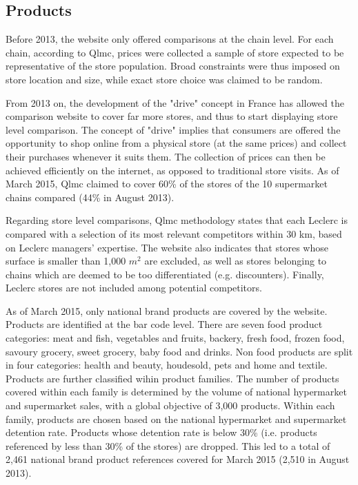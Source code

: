 \documentclass[english]{article}
\begin{document}
\subsection{Products}

Before 2013, the website only offered comparisons at the chain level. For each chain, according to Qlmc, prices were collected a sample of store expected to be representative of the store population. Broad constraints were thus imposed on store location and size, while exact store choice was claimed to be random.

From 2013 on, the development of the "drive" concept in France has allowed the comparison website to cover far more stores, and thus to start displaying store level comparison. The concept of "drive" implies that consumers are offered the opportunity to shop online from a physical store (at the same prices) and collect their purchases whenever it suits them. The collection of prices can then be achieved efficiently on the internet, as opposed to traditional store visits. As of March 2015, Qlmc claimed to cover 60\% of the stores of the 10 supermarket chains compared (44\% in August 2013).

Regarding store level comparisons, Qlmc  methodology states that each Leclerc is compared with a selection of its most relevant competitors within 30 km, based on Leclerc managers' expertise. The website also indicates that stores whose surface is smaller than 1,000 $m^2$ are excluded, as well as stores belonging to chains which are deemed to be too differentiated (e.g. discounters). Finally, Leclerc stores are not included among potential competitors.

As of March 2015, only national brand products are covered by the website. Products are identified at the bar code level. There are seven food product categories: meat and fish, vegetables and fruits, backery, fresh food, frozen food, savoury grocery, sweet grocery, baby food and drinks. Non food products are split in four categories: health and beauty, houdesold, pets and home and textile. Products are further classified wihin product families. The number of products covered within each family is determined by the volume of national hypermarket and supermarket sales, with a global objective of 3,000 products. Within each family, products are chosen based on the national hypermarket and supermarket detention rate. Products whose detention rate is below 30\% (i.e. products referenced by less than 30\% of the stores) are dropped. This led to a total of 2,461 national brand product references covered for March 2015 (2,510 in August 2013).
\end{document}

